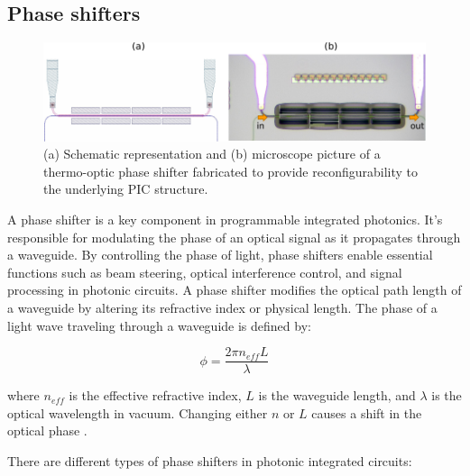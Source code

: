 
\subsection{Phase shifters}\label{sub:phase_shifters} %

\begin{figure}[h]
	\begin{center}
		\includegraphics{figures/ch2-phase_shifter.pdf}
	\end{center}
	\caption{(a) Schematic representation and (b) microscope picture of a thermo-optic phase shifter fabricated to provide reconfigurability to the underlying PIC structure.}\label{fig:ch2-phase_shifter}
\end{figure}

A phase shifter is a key component in programmable integrated photonics.
It's responsible for modulating the phase of an optical signal as it propagates through a waveguide.
By controlling the phase of light, phase shifters enable essential functions such as beam steering, optical interference control, and signal processing in photonic circuits.
A phase shifter modifies the optical path length of a waveguide by altering its refractive index or physical length.
The phase of a light wave traveling through a waveguide is defined by:

\begin{equation}
	\phi = \frac{2\pi n_{eff}
		L}{\lambda} \label{eq:ch1-phase_shift} \end{equation}

where \( n_{eff} \) is the effective refractive index, \( L \) is the waveguide length, and \( \lambda \) is the optical wavelength in vacuum.
Changing either \( n \) or \( L \) causes a shift in the optical phase \cite{chrostowski_silicon_2015}.

There are different types of phase shifters in photonic integrated circuits:

